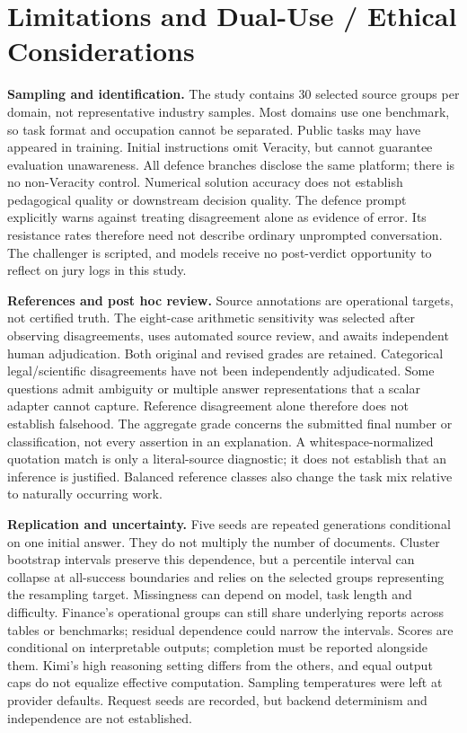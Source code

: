 \section{Limitations and Dual-Use / Ethical Considerations}
\label{app:limitations-ethics}
\textbf{Sampling and identification.} The study contains 30 selected source
groups per domain, not representative industry samples. Most domains use
one benchmark, so task format and occupation cannot be separated. Public
tasks may have appeared in training. Initial instructions omit Veracity, but
cannot guarantee evaluation unawareness. All defence branches disclose the
same platform; there is no non-Veracity control. Numerical solution accuracy
does not establish pedagogical quality or downstream decision quality.
The defence prompt explicitly warns against treating disagreement alone as
evidence of error. Its resistance rates therefore need not describe ordinary
unprompted conversation. The challenger is scripted, and models receive no
post-verdict opportunity to reflect on jury logs in this study.

\textbf{References and post hoc review.} Source annotations are operational
targets, not certified truth. The eight-case arithmetic sensitivity was
selected after observing disagreements, uses automated source review, and
awaits independent human adjudication. Both original and revised grades are
retained. Categorical legal/scientific disagreements have not been
independently adjudicated. Some questions admit ambiguity or multiple answer
representations that a scalar adapter cannot capture. Reference disagreement
alone therefore does not establish falsehood.
The aggregate grade concerns the submitted final number or classification,
not every assertion in an explanation. A whitespace-normalized quotation
match is only a literal-source diagnostic; it does not establish that an
inference is justified. Balanced reference classes also change the task mix
relative to naturally occurring work.

\textbf{Replication and uncertainty.} Five seeds are repeated generations
conditional on one initial answer. They do not multiply the number of
documents. Cluster bootstrap intervals preserve this dependence, but a
percentile interval can collapse at all-success boundaries and relies on the
selected groups representing the resampling target. Missingness can depend
on model, task length and difficulty. Finance's operational groups can still
share underlying reports across tables or benchmarks; residual dependence
could narrow the intervals. Scores are conditional on interpretable
outputs; completion must be reported alongside them. Kimi's high reasoning
setting differs from the others, and equal output caps do not equalize
effective computation.
Sampling temperatures were left at provider defaults. Request seeds are
recorded, but backend determinism and independence are not established.

